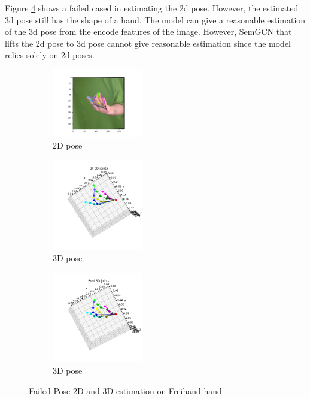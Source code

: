 \noindent
Figure \ref{fig:pose_2d_and_3d_on_failed_hand} shows a failed cased in estimating the 2d pose. However, the estimated 3d pose still has the shape of a hand. The model can give a reasonable estimation of the 3d pose from the encode features of the image. However, SemGCN that lifts the 2d pose to 3d pose cannot give reasonable estimation since the model relies solely on 2d poses.

\begin{figure}[ht]
    \begin{center}
        \begin{subfigure}[b]{0.32\textwidth}
            \includegraphics[width=150px]{assets/failed_2d.png}
            \caption{2D pose}
            \label{fig:failed_hand_2d}
        \end{subfigure}
        \begin{subfigure}[b]{0.32\textwidth}
            \includegraphics[width=150px]{assets/failed_3d_gt.png}
            \caption{3D pose}
            \label{fig:failed_hand_3d_gt}
        \end{subfigure}
        \begin{subfigure}[b]{0.32\textwidth}
            \includegraphics[width=150px]{assets/failed_3d_pred.png}
            \caption{3D pose}
            \label{fig:failed_hand_3d_pred}
        \end{subfigure}
	    \caption{Failed Pose 2D and 3D estimation on Freihand hand}
	    \label{fig:pose_2d_and_3d_on_failed_hand}        
    \end{center}
\end{figure}


